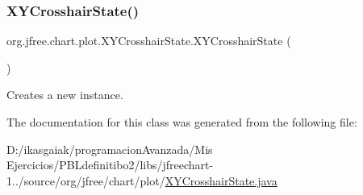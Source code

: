 \subsubsection{\texorpdfstring{X\+Y\+Crosshair\+State()}{XYCrosshairState()}}
{\footnotesize\ttfamily org.\+jfree.\+chart.\+plot.\+X\+Y\+Crosshair\+State.\+X\+Y\+Crosshair\+State (\begin{DoxyParamCaption}{ }\end{DoxyParamCaption})}

Creates a new instance. 

The documentation for this class was generated from the following file\+:\begin{DoxyCompactItemize}
\item 
D\+:/ikasgaiak/programacion\+Avanzada/\+Mis Ejercicios/\+P\+B\+Ldefinitibo2/libs/jfreechart-\/1../source/org/jfree/chart/plot/\mbox{\hyperlink{_x_y_crosshair_state_8java}{X\+Y\+Crosshair\+State.\+java}}\end{DoxyCompactItemize}

